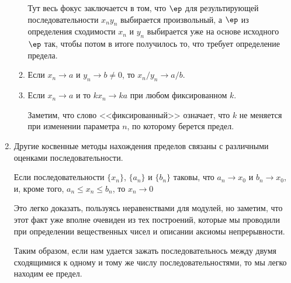 \begin{enumerate}
\begin{enumerate}[\bf {Lim}1]
Тут весь фокус заключаетсч в том, что $\ep$ для результирующей последовательности $x_ny_n$ выбирается произвольный, а $\ep$ из определения сходимости $x_n$ и $y_n$ выбирается уже на основе исходного $\ep$ так, чтобы потом в итоге получилось то, что требует определение предела.
\item Если $x_n\to a$ и $y_n\to b\ne 0$, то $x_n/y_n\to a/b$.
\item Если $x_n\to a$ и то $kx_n\to ka$ при любом фиксированном $k$.

Заметим, что слово <<фиксированный>> означает, что $k$ не меняется при изменении параметра $n$, по которому берется предел.
\end{enumerate}

\item Другие косвенные методы нахождения пределов связаны с различными оценками последовательности.
\begin{lem}
Если последовательности $\{x_n\}$, $\{a_n\}$ и $\{b_n\}$ таковы, что $a_n\to x_0$ и $b_n\to x_0$, и, кроме того, $a_n\le x_n\le b_n$, то $x_n\to 0$
\end{lem}
Это легко доказать, пользуясь неравенствами для модулей, но заметим, что этот факт уже вполне очевиден из тех построений, которые мы проводили при определении вещественных чисел и описании аксиомы непрерывности.

Таким образом, если нам удается зажать последовательнось между двумя сходящимися к одному и тому же числу последовательностями, то мы легко находим ее предел.






\end{enumerate}
